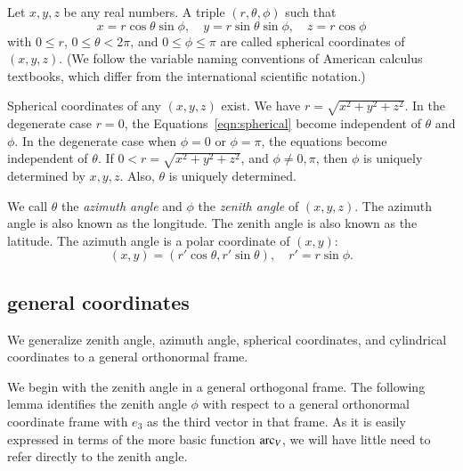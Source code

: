 \begin{definition}
Let $x,y,z$ be any real numbers.  A
triple $(r,\theta,\phi)$ such that
    \begin{equation}
    \label{eqn:spherical}
    x = r\cos\theta\sin\phi,\quad y = r\sin\theta\sin\phi,\quad
    z = r\cos\phi
    \end{equation}
with $0\le r$, $0\le\theta<2\pi$, and $0\le\phi\le\pi$ are called
spherical coordinates of $(x,y,z)$.  (We follow the variable
naming conventions of American calculus textbooks, which differ
from the international scientific notation.)
\end{definition}

Spherical coordinates of any $(x,y,z)$ exist.
We have $r = \sqrt{x^2+y^2+z^2}$.  In the degenerate case $r=0$,
the Equations~\ref{eqn:spherical} become independent of $\theta$
and $\phi$. In the degenerate case when $\phi = 0$ or $\phi =
\pi$, the equations become independent of $\theta$. If $0<r =
\sqrt{x^2+y^2+z^2}$, and $\phi\ne 0,\pi$,  then $\phi$ is uniquely
determined by $x,y,z$. Also, $\theta$ is uniquely determined.


We call $\theta$ the {\it azimuth angle\/} and $\phi$ the {\it
zenith angle\/} of $(x,y,z)$.  The azimuth angle is also known as
the longitude.  The zenith angle is also known as the latitude. The
azimuth angle is a polar coordinate of $(x,y)$:
    $$
    (x,y) = (r'\cos\theta,r'\sin\theta), \quad r' = r\sin\phi.
    $$


\subsection{general coordinates}

We generalize zenith angle, azimuth angle,
spherical coordinates, and cylindrical coordinates 
to a general orthonormal frame.

We begin with the zenith angle in a general orthogonal frame.
The following lemma identifies the zenith angle $\phi$ with respect to
a general orthonormal coordinate frame with $e_3$ as the third
vector in that frame.  As it is easily expressed in terms
of the more basic function $\operatorname{arc}_V$, 
we will have little need to refer directly to the zenith angle.

